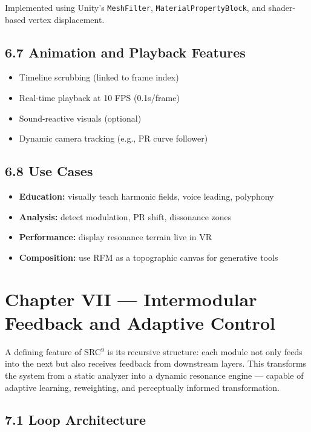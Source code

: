 Implemented using Unity’s \texttt{MeshFilter}, \texttt{MaterialPropertyBlock}, and shader-based vertex displacement.

\subsection*{6.7 Animation and Playback Features}

\begin{itemize}
    \item Timeline scrubbing (linked to frame index)
    \item Real-time playback at 10 FPS (0.1s/frame)
    \item Sound-reactive visuals (optional)
    \item Dynamic camera tracking (e.g., PR curve follower)
\end{itemize}

\subsection*{6.8 Use Cases}

\begin{itemize}
    \item \textbf{Education:} visually teach harmonic fields, voice leading, polyphony
    \item \textbf{Analysis:} detect modulation, PR shift, dissonance zones
    \item \textbf{Performance:} display resonance terrain live in VR
    \item \textbf{Composition:} use RFM as a topographic canvas for generative tools
\end{itemize}

\section*{Chapter VII — Intermodular Feedback and Adaptive Control}

A defining feature of SRC$^{9}$ is its recursive structure: each module not only feeds into the next but also receives feedback from downstream layers. This transforms the system from a static analyzer into a dynamic resonance engine — capable of adaptive learning, reweighting, and perceptually informed transformation.

\subsection*{7.1 Loop Architecture}

